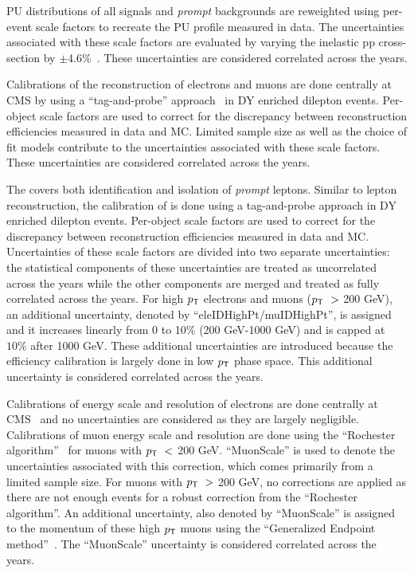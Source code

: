 \ac{PU} distributions of all signals and \emph{prompt} backgrounds are reweighted using per-event scale factors to recreate the \ac{PU} profile measured in data. The uncertainties associated with these scale factors are evaluated by varying the inelastic pp cross-section by $\pm$4.6\%~\cite{Sirunyan:2018nqx}. These uncertainties are considered correlated across the years.

Calibrations of the reconstruction of electrons and muons are done centrally at \ac{CMS} by using a ``tag-and-probe'' approach~\cite{CMS:2010svw} in \ac{DY} enriched dilepton events. Per-object scale factors are used to correct for the discrepancy between reconstruction efficiencies measured in data and \ac{MC}. Limited sample size as well as the choice of fit models contribute to the uncertainties associated with these scale factors. These uncertainties are considered correlated across the years.

The \TOP covers both identification and isolation of \emph{prompt} leptons. Similar to lepton reconstruction, the calibration of \TOP is done using a tag-and-probe approach in \ac{DY} enriched dilepton events. Per-object scale factors are used to correct for the discrepancy between reconstruction efficiencies measured in data and \ac{MC}. Uncertainties of these scale factors are divided into two separate uncertainties: the statistical components of these uncertainties are treated as uncorrelated across the years while the other components are merged and treated as fully correlated across the years. For high $p_{\textsf{T}}$ electrons and muons ($p_{\textsf{T}}~>$ 200 GeV), an additional uncertainty, denoted by ``eleIDHighPt/muIDHighPt'', is assigned and it increases linearly from 0 to 10$\%$ (200 GeV-1000 GeV) and is capped at $10\%$ after 1000 GeV. These additional uncertainties are introduced because the efficiency calibration is largely done in low $p_{\textsf{T}}$ phase space. This additional uncertainty is considered correlated across the years.

Calibrations of energy scale and resolution of electrons are done centrally at \ac{CMS}~\cite{CMS:2013lxn} and no uncertainties are considered as they are largely negligible. Calibrations of muon energy scale and resolution are done using the ``Rochester algorithm''~\cite{Bodek:2012id} for muons with $p_{\textsf{T}}~<$ 200 GeV. ``MuonScale'' is used to denote the uncertainties associated with this correction, which comes primarily from a limited sample size. For muons with $p_{\textsf{T}}~>$ 200 GeV, no corrections are applied as there are not enough events for a robust correction from the ``Rochester algorithm''. An additional uncertainty, also denoted by ``MuonScale'' is assigned to the momentum of these high $p_{\textsf{T}}$ muons using the ``Generalized Endpoint method''~\cite{CMS:2018rym}. The ``MuonScale'' uncertainty is considered correlated across the years.

